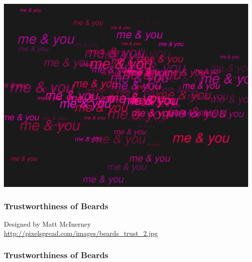 \documentclass[12pt]{beamer}\usepackage[]{graphicx}\usepackage[]{color}
\makeatletter
\def\maxwidth{ %
  \ifdim\Gin@nat@width>\linewidth
    \linewidth
  \else
    \Gin@nat@width
  \fi
}
\newenvironment{knitrout}{}{} %
\makeatother
\begin{document}

\begin{frame}[fragile]

\begin{knitrout}
\color{fgcolor}
\includegraphics[width=\maxwidth]{figure/me-and-you3-1} 

\end{knitrout}

\end{frame}


\begin{frame}
\begin{center}
\Huge{}
\end{center}
\end{frame}


\begin{frame}
\frametitle{Trustworthiness of Beards}
\begin{center}

Designed by Matt McInerney \\
{\scriptsize \url{http://pixelspread.com/images/beards_trust_2.jpg}}
\end{center}
\end{frame}


\begin{frame}
\frametitle{Trustworthiness of Beards}
\begin{center}
\end{center}
\end{frame}
\end{document}
